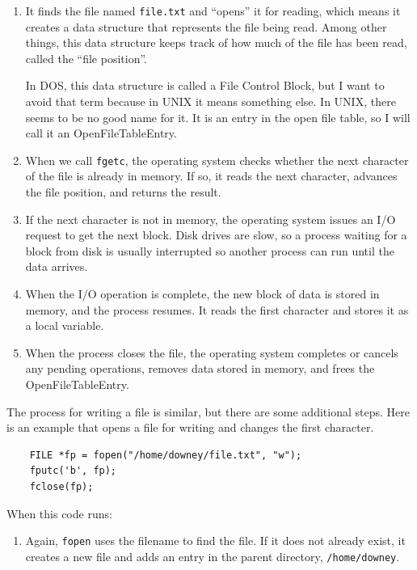 \documentclass[12pt]{book}
\begin{document}
{\begin{enumerate}
\item It finds the file named {\tt file.txt} and ``opens'' it for
  reading, which means it creates a data structure that represents the
  file being read.  Among other things, this data structure
  keeps track of how much of the file has been read, called the ``file
  position''.

  In DOS, this data structure is called a File Control Block, but I
  want to avoid that term because in UNIX it means something else.  In
  UNIX, there seems to be no good name for it.  It is an entry in the
  open file table, so I will call it an OpenFileTableEntry.

\item When we call {\tt fgetc}, the operating system checks whether
  the next character of the file is already in memory.  If so, it
  reads the next character, advances the file position, and returns
  the result.

\item If the next character is not in memory, the operating
  system issues an I/O request to get the next block.  Disk drives are
  slow, so a process waiting for a block from disk is usually
  interrupted so another process can run until the data arrives.

\item When the I/O operation is complete, the new block of data is
  stored in memory, and the process resumes.  It reads the first
  character and stores it as a local variable.

\item When the process closes the file, the operating system completes
  or cancels any pending operations, removes data stored in
  memory, and frees the OpenFileTableEntry.

\end{enumerate}

The process for writing a file is similar, but there are some
additional steps.  Here is an example that opens a file for
writing and changes the first character.

\begin{verbatim}
    FILE *fp = fopen("/home/downey/file.txt", "w");
    fputc('b', fp);
    fclose(fp);
\end{verbatim}

When this code runs:

\begin{enumerate}

\item Again, {\tt fopen} uses the filename to find the file.  If it
  does not already exist, it creates a new file and adds an entry in
  the parent directory, {\tt /home/downey}.


\end{enumerate}}
\end{document}
